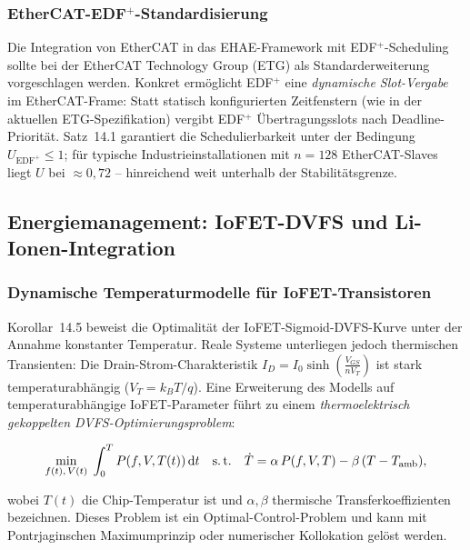 ﻿\documentclass[a4paper,12pt]{scrreprt}
\theoremstyle{definition}
\begin{document}
	\subsubsection{EtherCAT-EDF\texorpdfstring{$^+$}{+}-Standardisierung}
	
	Die Integration von EtherCAT \cite{IEC61158} in das EHAE-Framework
	\cite{Epp2026ethercate} mit EDF$^+$-Scheduling sollte bei der
	EtherCAT Technology Group (ETG) als Standarderweiterung vorgeschlagen werden.
	Konkret ermöglicht EDF$^+$ eine \emph{dynamische Slot-Vergabe} im
	EtherCAT-Frame: Statt statisch konfigurierten Zeitfenstern (wie in
	der aktuellen ETG-Spezifikation) vergibt EDF$^+$ Übertragungsslots
	nach Deadline-Priorität. Satz~14.1 garantiert die Schedulierbarkeit
	unter der Bedingung $U_{\mathrm{EDF}^+} \le 1$; für typische
	Industrieinstallationen mit $n = 128$ EtherCAT-Slaves liegt
	$U$ bei $\approx 0{,}72$ -- hinreichend weit unterhalb der
	Stabilitätsgrenze.
	
	\subsection{Energiemanagement: IoFET-DVFS und Li-Ionen-Integration}
	
	\subsubsection{Dynamische Temperaturmodelle für IoFET-Transistoren}
	
	Korollar~14.5 beweist die Optimalität der IoFET-Sigmoid-DVFS-Kurve
	unter der Annahme konstanter Temperatur. Reale Systeme unterliegen
	jedoch thermischen Transienten: Die Drain-Strom-Charakteristik
	$I_D = I_0 \sinh\!\left(\frac{V_{GS}}{nV_T}\right)$ ist stark temperaturabhängig
	($V_T = k_BT/q$). Eine Erweiterung des Modells \cite{Epp2026iono}
	auf temperaturabhängige IoFET-Parameter führt zu einem
	\emph{thermoelektrisch gekoppelten DVFS-Optimierungsproblem}:
	
	\[
	\min_{f(t),\, V(t)}\; \int_0^T P(f,V,T(t))\,\mathrm{d}t
	\quad\text{s.\,t.}\quad
	\dot{T} = \alpha\, P(f,V,T) - \beta\,(T - T_{\mathrm{amb}}),
	\]
	
	wobei $T(t)$ die Chip-Temperatur ist und $\alpha, \beta$ thermische
	Transferkoeffizienten bezeichnen. Dieses Problem ist ein Optimal-Control-Problem
	und kann mit Pontrjaginschen Maximumprinzip oder numerischer
	Kollokation gelöst werden.
	
\end{document}

